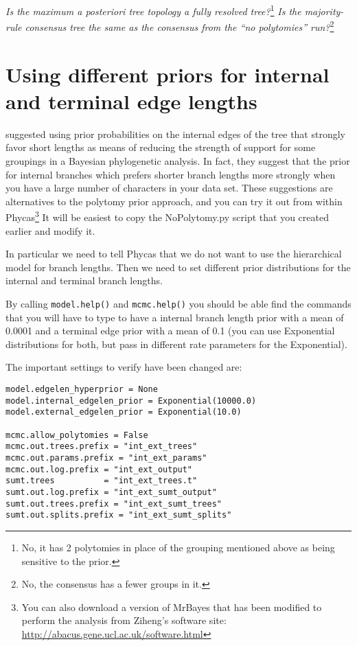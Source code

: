 \documentclass{article}
\newcommand{\cmd}[1]{\texttt{#1}\xspace}
\newcommand{\mb}{MrBayes\xspace}
\newcommand{\phycas}{Phycas\xspace}
\newcommand{\localfile}[1]{\textsf{#1}\xspace}
\newcommand{\QandA}[2]{\textit{#1}\footnote{#2}\xspace}
\begin{document}
\QandA{Is the maximum a posteriori tree topology a fully resolved tree?}{No, it has 2 polytomies in place of the grouping mentioned above as being sensitive to the prior.}
\QandA{Is the majority-rule consensus tree the same as the consensus from the ``no polytomies'' run?}{No, the consensus has a fewer groups in it.}


\section{Using different priors for internal and terminal edge lengths}
\citet{YangR2005} \citep[and][]{Yang2007} suggested using prior probabilities on the internal edges of the tree that strongly favor short lengths as means of reducing the strength
of support for some groupings in a Bayesian phylogenetic analysis.
In fact, they suggest that the prior for internal branches which prefers shorter branch lengths more
strongly when you have a large number of characters in your data set.
These suggestions are alternatives to the polytomy prior approach, and you can try it out from within 
\phycas\footnote{You can also download a version of \mb that has been modified to perform the analysis from Ziheng's software site: \url{http://abacus.gene.ucl.ac.uk/software.html}}
It will be easiest to copy the \localfile{NoPolytomy.py} script that you created earlier 
and modify it.

In particular we need to tell \phycas that we do not want to use the hierarchical model for
branch lengths.
Then we need to set different prior distributions for the internal and terminal branch lengths.

By calling \cmd{model.help()} and \cmd{mcmc.help()} you should be able find the commands that you will have to type to have a internal branch length prior with a mean of 0.0001 and a terminal edge prior with a mean of 0.1 (you can use Exponential distributions for both, but pass in different rate parameters for the Exponential).

The important settings to verify have been changed are:
\begin{verbatim}
model.edgelen_hyperprior = None
model.internal_edgelen_prior = Exponential(10000.0)
model.external_edgelen_prior = Exponential(10.0)

mcmc.allow_polytomies = False
mcmc.out.trees.prefix = "int_ext_trees"
mcmc.out.params.prefix = "int_ext_params"
mcmc.out.log.prefix = "int_ext_output"
sumt.trees          = "int_ext_trees.t"
sumt.out.log.prefix = "int_ext_sumt_output"
sumt.out.trees.prefix = "int_ext_sumt_trees"
sumt.out.splits.prefix = "int_ext_sumt_splits"
\end{verbatim}
\end{document}
